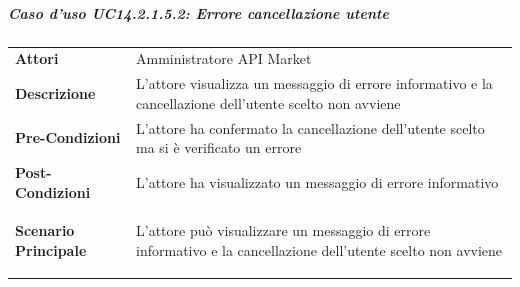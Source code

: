 \subparagraph{Caso d'uso UC14.2.1.5.2: Errore cancellazione utente}
\label{UC14_2_1_5_2}

\begin{minipage}{\linewidth}
	\begin{tabular}{ l | p{11cm}}
		\hline
		\rowcolor{Gray}
		\multicolumn{2}{c}{UC14.2.1.5.2 - Errore cancellazione utente} \\
		\hline
		\textbf{Attori} & Amministratore API Market \\
		\textbf{Descrizione} & L'attore visualizza un messaggio di errore informativo e la cancellazione dell'utente scelto non avviene \\
		\textbf{Pre-Condizioni} & L'attore ha confermato la cancellazione dell'utente scelto ma si è verificato un errore \\
		\textbf{Post-Condizioni} & L'attore ha visualizzato un messaggio di errore informativo \\
		\textbf{Scenario Principale} & 
		\begin{enumerate*}[label=(\arabic*.),itemjoin={\newline}]
			\item L'attore può visualizzare un messaggio di errore informativo e la cancellazione dell'utente scelto non avviene
		\end{enumerate*}\\
	\end{tabular}
\end{minipage}